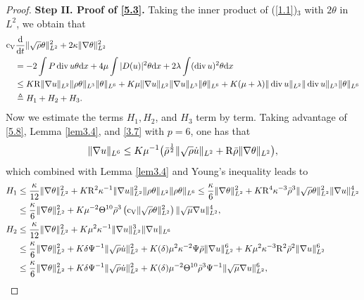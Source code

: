 \documentclass[11pt]{article}
\DeclareMathOperator{\divv}{div}
\begin{document}
\begin{proof}
{\bf Step II. Proof of \eqref{5.3}.}
Taking the inner product of (\ref{1.1})$_3$ with $2 \theta $ in $L^2$, we obtain that
\begin{align}\label{5.11}
& {\rm c_V} \frac{\mathrm{d}}{\mathrm{d} t} \|\sqrt\rho \theta \|_{L^2}^2 + 2 \kappa \|\nabla \theta \|_{L^2}^2\notag \\
& \quad = - 2 \int P \divv u \theta \mathrm{d} x + 4 \mu \int |D(u)|^2 \theta \mathrm{d} x + 2 \lambda \int (\divv u)^2 \theta \mathrm{d} x \notag \\
& \quad \leq K {\rm R} \|\nabla u\|_{L^2} \|\rho \theta \|_{L^3} \|\theta \|_{L^6} + K \mu \|\nabla u\|_{L^2} \|\nabla u\|_{L^3} \|\theta \|_{L^6} + K (\mu + \lambda ) \|\divv u\|_{L^2} \|\divv u\|_{L^3} \|\theta \|_{L^6} \notag \\
& \quad \triangleq H_1 + H_2 + H_3.
\end{align}
Now we estimate the terms $H_1,H_2$, and $H_3$ term by term.
Taking advantage of \eqref{5.8}, Lemma \ref{lem3.4}, and \eqref{3.7} with $p = 6$, one has that
\begin{equation}\label{5.12}
\|\nabla u\|_{L^6}
\leq K \mu^{-1} \big( \bar{\rho}^{\frac{1}{2}} \|\sqrt{\rho} \dot{u}\|_{L^2} + {\rm R} \bar{\rho} \|\nabla \theta \|_{L^2} \big),
\end{equation}
which combined with Lemma \ref{lem3.4} and Young's inequality leads to
\begin{align*}
H_1
& \leq \frac{\kappa}{12} \|\nabla \theta \|_{L^2}^2 + K {\rm R}^2 \kappa^{-1} \|\nabla u\|_{L^2}^2 \|\rho \theta \|_{L^2} \|\rho \theta \|_{L^6} \leq \frac{\kappa}{6} \|\nabla \theta \|_{L^2}^2 + K {\rm R}^4 \kappa^{-3} \bar{\rho}^3 \|\sqrt{\rho} \theta \|_{L^2}^2 \|\nabla u\|_{L^2}^4\\
& \leq \frac{\kappa}{6} \|\nabla \theta \|_{L^2}^2 + K \mu^{-2} \Theta^{10} \bar{\rho}^3 \left({\rm c_V} \|\sqrt{\rho} \theta \|_{L^2}^2 \right) \|\sqrt{\mu}\nabla u\|_{L^2}^4,\\
H_2
& \leq \frac{\kappa}{12} \|\nabla \theta \|_{L^2}^2 + K \mu^2 \kappa^{-1} \|\nabla u\|_{L^2}^3 \|\nabla u\|_{L^6}\\
& \leq \frac{\kappa}{6} \|\nabla \theta \|_{L^2}^2 + K \delta \Psi^{-1} \|\sqrt{\rho} \dot{u}\|_{L^2}^2 + K (\delta) \mu^2 \kappa^{-2} \Psi \bar{\rho} \|\nabla u\|_{L^2}^6 + K \mu^2 \kappa^{-3} {\rm R}^2 \bar{\rho}^2 \|\nabla u\|_{L^2}^6\\
& \leq \frac{\kappa}{6} \|\nabla \theta \|_{L^2}^2 + K \delta \Psi^{-1} \|\sqrt{\rho} \dot{u}\|_{L^2}^2 + K (\delta) \mu^{-2} \Theta^{10} \bar{\rho}^3 \Psi^{-1} \|\sqrt{\mu}\nabla u\|_{L^2}^6,\\

\end{align*}
\end{proof}
\end{document}
